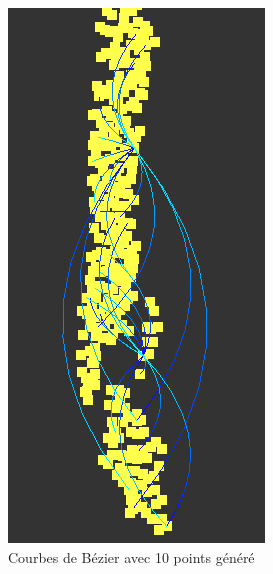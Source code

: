 \documentclass[12pt]{article}
\begin{document}
		\begin{figure}[!h]
		\begin{center}
		\includegraphics[scale=.60]{10_generated_points.png}
		\caption{Courbes de Bézier avec 10 points généré}
		\end{center}
		\end{figure}
		
\end{document}
